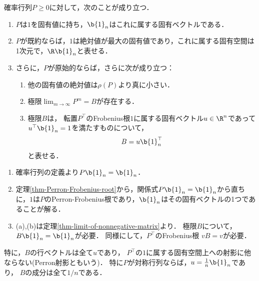 \documentclass[uplatex, dvipdfmx]{jsreport}
\begin{document}
\begin{proposition}[確率行列の性質]
    確率行列$P\ge0$に対して，次のことが成り立つ．
    \begin{enumerate}
        \item $P$は$1$を固有値に持ち，$\b{1}_n$はこれに属する固有ベクトルである．
        \item $P$が既約ならば，$1$は絶対値が最大の固有値であり，これに属する固有空間は1次元で，$\R\b{1}_n$と表せる．
        \item さらに，$P$が原始的ならば，さらに次が成り立つ：
        \begin{enumerate}
            \item 他の固有値の絶対値は$\rho(P)$より真に小さい．
            \item 極限$\lim_{m\to\infty}P^m=B$が存在する．
            \item 極限$B$は，
            転置$P^\top$のFrobenius根$1$に属する固有ベクトル$u\in\R^n$であって$u^\top\b{1}_n=1$を満たすものについて，
            \[B=u\b{1}_n^\top\]
            と表せる．
        \end{enumerate}
    \end{enumerate}
\end{proposition}
\begin{Proof}\mbox{}
    \begin{enumerate}
        \item 確率行列の定義より$P\b{1}_n=\b{1}_n$．
        \item 定理\ref{thm-Perron-Frobenius-root}から，関係式$P\b{1}_n=\b{1}_n$から直ちに，$1$は$P$のPerron-Frobenius根であり，$\b{1}_n$はその固有ベクトルの1つであることが解る．
        \item (a),(b)は定理\ref{thm-limit-of-nonnegative-matrix}より．
        極限$B$について，$B\b{1}_n=\b{1}_n$が必要．
        同様にして，$P^\top$のFrobenius根
        $vB=v$が必要．
    \end{enumerate}
\end{Proof}
\begin{remark}\label{remark-limit-of-probability-matrix}
    特に，$B$の行ベクトルは全て$u$であり，
    $P^\top$の$1$に属する固有空間上への射影に他ならない(Perron射影ともいう)．
    特に$P$が対称行列ならば，$u=\frac{1}{n}\b{1}_n$であり，
    $B$の成分は全て$1/n$である．
\end{remark}
\end{document}
